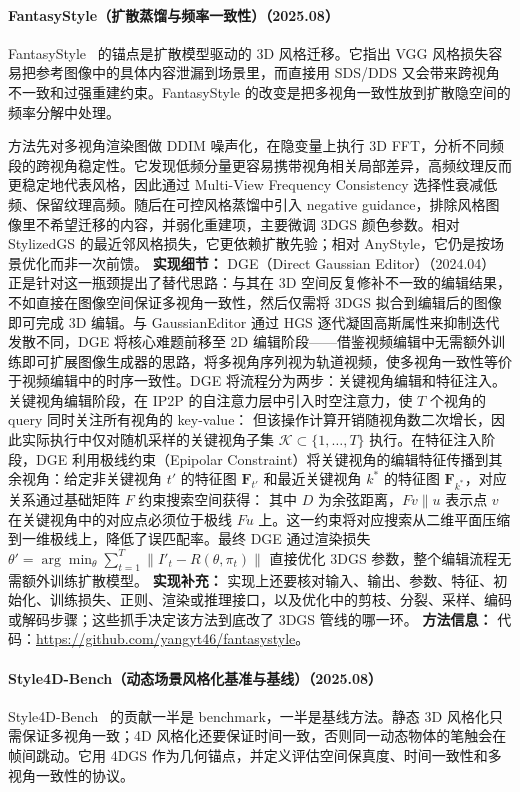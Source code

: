 \paragraph{FantasyStyle（扩散蒸馏与频率一致性）（2025.08）}
FantasyStyle~\cite{2508_08136} 的锚点是扩散模型驱动的 3D 风格迁移。它指出 VGG 风格损失容易把参考图像中的具体内容泄漏到场景里，而直接用 SDS/DDS 又会带来跨视角不一致和过强重建约束。FantasyStyle 的改变是把多视角一致性放到扩散隐空间的频率分解中处理。

方法先对多视角渲染图做 DDIM 噪声化，在隐变量上执行 3D FFT，分析不同频段的跨视角稳定性。它发现低频分量更容易携带视角相关局部差异，高频纹理反而更稳定地代表风格，因此通过 Multi-View Frequency Consistency 选择性衰减低频、保留纹理高频。随后在可控风格蒸馏中引入 negative guidance，排除风格图像里不希望迁移的内容，并弱化重建项，主要微调 3DGS 颜色参数。相对 StylizedGS 的最近邻风格损失，它更依赖扩散先验；相对 AnyStyle，它仍是按场景优化而非一次前馈。
\textbf{实现细节：} DGE（Direct Gaussian Editor）（2024.04） 正是针对这一瓶颈提出了替代思路：与其在 3D 空间反复修补不一致的编辑结果，不如直接在图像空间保证多视角一致性，然后仅需将 3DGS 拟合到编辑后的图像即可完成 3D 编辑。与 GaussianEditor 通过 HGS 逐代凝固高斯属性来抑制迭代发散不同，DGE 将核心难题前移至 2D 编辑阶段——借鉴视频编辑中无需额外训练即可扩展图像生成器的思路，将多视角序列视为轨道视频，使多视角一致性等价于视频编辑中的时序一致性。DGE 将流程分为两步：关键视角编辑和特征注入。关键视角编辑阶段，在 IP2P 的自注意力层中引入时空注意力，使 $T$ 个视角的 query 同时关注所有视角的 key-value： 但该操作计算开销随视角数二次增长，因此实际执行中仅对随机采样的关键视角子集 $\mathcal{K} \subset \{1, \ldots, T\}$ 执行。在特征注入阶段，DGE 利用极线约束（Epipolar Constraint）将关键视角的编辑特征传播到其余视角：给定非关键视角 $t'$ 的特征图 $\mathbf{F}_{t'}$ 和最近关键视角 $k^{*}$ 的特征图 $\mathbf{F}_{k^{*}}$，对应关系通过基础矩阵 $F$ 约束搜索空间获得： 其中 $D$ 为余弦距离，$Fv \parallel u$ 表示点 $v$ 在关键视角中的对应点必须位于极线 $Fu$ 上。这一约束将对应搜索从二维平面压缩到一维极线上，降低了误匹配率。最终 DGE 通过渲染损失 $\theta' = \arg\min_\theta \sum_{t=1}^{T} \| I'_t - R(\theta, \pi_t) \|$ 直接优化 3DGS 参数，整个编辑流程无需额外训练扩散模型。
\textbf{实现补充：} 实现上还要核对输入、输出、参数、特征、初始化、训练损失、正则、渲染或推理接口，以及优化中的剪枝、分裂、采样、编码或解码步骤；这些抓手决定该方法到底改了 3DGS 管线的哪一环。
\textbf{方法信息：} 代码：\url{https://github.com/yangyt46/fantasystyle}。
\paragraph{Style4D-Bench（动态场景风格化基准与基线）（2025.08）}
Style4D-Bench~\cite{2508_19243} 的贡献一半是 benchmark，一半是基线方法。静态 3D 风格化只需保证多视角一致；4D 风格化还要保证时间一致，否则同一动态物体的笔触会在帧间跳动。它用 4DGS 作为几何锚点，并定义评估空间保真度、时间一致性和多视角一致性的协议。

